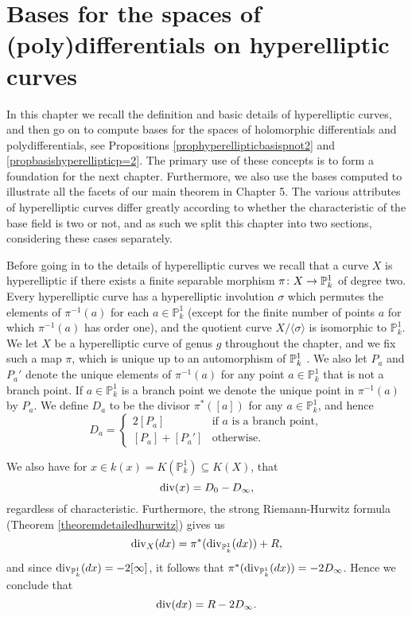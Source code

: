 \chapter{Bases for the spaces of (poly)differentials on hyperelliptic curves}\label{chapterhyperellipticcurves}


In this chapter we recall the definition and basic details of hyperelliptic curves, and then go on to compute bases for the spaces of holomorphic differentials and polydifferentials, see Propositions \ref{prophyperellipticbasispnot2} and \ref{propbasishyperellipticp=2}.
The primary use of these concepts is to form a foundation for the next chapter.
Furthermore, we also use the bases computed to illustrate all the facets of our main theorem in Chapter 5.
The various attributes of hyperelliptic curves differ greatly according to whether the characteristic of the base field is two or not, and as such we split this chapter into two sections, considering these cases separately.


Before going in to the details of hyperelliptic curves we recall that a curve $X$ is hyperelliptic if there exists a finite separable morphism $\pi \colon X \rightarrow {\mathbb P}_k^1$ of degree two.
Every hyperelliptic curve has a hyperelliptic involution $\sigma$ which permutes the elements of $\pi^{-1}(a)$ for each $a \in \mathbb P_k^1$ (except for the finite number of points $a$ for which $\pi^{-1}(a)$ has order one), and the quotient curve $X /\langle \sigma \rangle$ is isomorphic to $\mathbb P_k^1$.
We let $X$ be a hyperelliptic curve of genus $g$ throughout the chapter, and we fix such a map $\pi$, which is unique up to an automorphism of ${\mathbb P}_k^1$ \cite[Prop.\ 7.4.29]{liu}.
We also let $P_a$ and $P_a'$ denote the unique elements of $\pi^{-1}(a)$ for any point $a \in \mathbb P_k^1$ that is not a branch point.
If $a \in \mathbb P_k^1$ is a branch point we denote the unique point in $\pi^{-1}(a)$ by $P_a$.
We define $D_a$ to be the divisor $\pi^*\left([a]\right)$ for any $a \in \mathbb P_k^1$, and hence
    \begin{equation*}
    D_a= 
        \begin{cases}
         2[P_a] & \text{if $a$ is a branch point}, \\
         [P_a] + [P_a'] & \text{otherwise.}
        \end{cases}
    \end{equation*}

We also have for $x \in k(x)  = K(\mathbb P_k^1) \subseteq K(X)$, that
    \begin{equation}\label{equationdivxpis2}
    \operatorname{div} (x)  = D_0 - D_\infty,
    \end{equation}
regardless of characteristic.
Furthermore, the strong Riemann-Hurwitz formula (Theorem \ref{theoremdetailedhurwitz}) gives us
    \[
    \operatorname{div}_X (dx) = \pi^*( \operatorname{div}_{\mathbb P^1_k}(dx)) + R,
    \]
and since $\operatorname{div}_{{\mathbb P}_k^1}(dx) = -2[\infty]$, it follows that $\pi^*(\operatorname{div}_{{\mathbb P}_k^1}(dx)) = -2D_\infty$.
Hence we conclude that
    \begin{equation}\label{equationdifferentialdivisor}
    \operatorname{div}(dx) = R - 2D_\infty.
    \end{equation}


